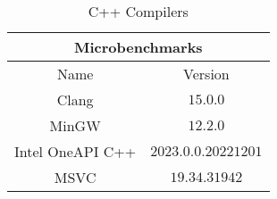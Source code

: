 \begin{table}[H]
    \centering
    \begin{tabular}{|| c | c ||}
    \hline
    \multicolumn{2}{||c||}{Microbenchmarks} \\ [0.5ex] \hline\hline
    Name & Version \\\hline
    Clang & $15.0.0$ \\
    MinGW & $12.2.0$ \\
    Intel OneAPI C++ & $2023.0.0.20221201$ \\
    MSVC & $19.34.31942$ \\\hline
    \end{tabular}
    \caption{C++ Compilers}
    \label{tab:compilers}
\end{table}
